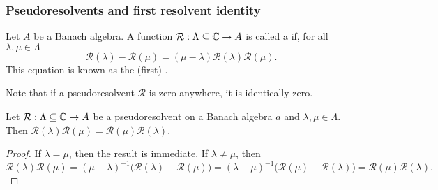 \subsubsection{Pseudoresolvents and first resolvent identity}
\begin{definition}
Let $A$ be a Banach algebra. A function $\mathcal{R}:\Lambda \subseteq \mathbb{C} \to A$ is called a  if, for all $\lambda,\mu\in\Lambda$
\[ \mathcal{R}(\lambda) - \mathcal{R}(\mu) = (\mu-\lambda)\mathcal{R}(\lambda)\mathcal{R}(\mu). \]
This equation is known as the (first) .
\end{definition}

Note that if a pseudoresolvent $\mathcal{R}$ is zero anywhere, it is identically zero.

\begin{lemma}
Let $\mathcal{R}:\Lambda \subseteq \mathbb{C} \to A$ be a pseudoresolvent on a Banach algebra $a$ and $\lambda,\mu\in\Lambda$. Then $\mathcal{R}(\lambda)\mathcal{R}(\mu) = \mathcal{R}(\mu)\mathcal{R}(\lambda)$.
\end{lemma}
\begin{proof}
If $\lambda = \mu$, then the result is immediate. If $\lambda \neq \mu$, then
\[ \mathcal{R}(\lambda)\mathcal{R}(\mu) = (\mu-\lambda)^{-1}\big(\mathcal{R}(\lambda) - \mathcal{R}(\mu)\big) = (\lambda - \mu)^{-1}\big(\mathcal{R}(\mu) - \mathcal{R}(\lambda)\big) = \mathcal{R}(\mu)\mathcal{R}(\lambda). \]
\end{proof}

